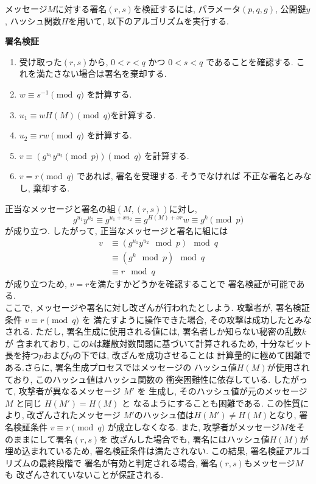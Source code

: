 \vspace{1em}
メッセージ$M$に対する署名$(r, s)$を検証するには, パラメータ$(p,q,g)$, 
公開鍵$y$, ハッシュ関数$H$を用いて, 以下のアルゴリズムを実行する.
\vspace{1em}
\let\ltxlist\list
\begin{breakitembox}[l]{\textbf{署名検証}}
  　
  \begin{enumerate}[parsep=7pt]
    \item 受け取った$(r,s)$から, $0<r<q$ かつ $0<s<q$ であることを確認する. 
    これを満たさない場合は署名を棄却する.
    \item $w\equiv s^{-1}\pmod q$ を計算する.
    \item $u_1\equiv wH(M)\pmod q$を計算する.
    \item $u_2\equiv rw\pmod q$ を計算する.
    \item $v\equiv (g^{u_1}y^{u_2}\pmod p)\pmod q$ を計算する.
    \item $v=r\pmod  q$ であれば, 署名を受理する. そうでなければ
    不正な署名とみなし, 棄却する.
  \end{enumerate}
\end{breakitembox}
\vspace{1em}
\indent 正当なメッセージと署名の組$(M, (r, s))$に対し, 
\[
  g^{u_1}y^{u_2}\equiv g^{u_1+xu_2} \equiv g^{H(M)+xr}w\equiv g^{k}\pmod p
\]
が成り立つ. したがって, 正当なメッセージと署名に組には 
\begin{align*}
  v &\equiv (g^{u_1}y^{u_2} \mod p) \mod q \\
    &\equiv (g^k \mod p) \mod q \\
    &\equiv r \mod q
\end{align*}
が成り立つため, $v=r$を満たすかどうかを確認することで
署名検証が可能である.\\
\indent ここで, メッセージや署名に対し改ざんが行われたとしよう. 
攻撃者が, 署名検証条件 $v \equiv r \pmod{q}$ を
満たすように操作できた場合, その攻撃は成功したとみなされる. ただし, 
署名生成に使用される値には, 署名者しか知らない秘密の乱数$k$が
含まれており, この$k$は離散対数問題に基づいて計算されるため, 
十分なビット長を持つ$p$および$q$の下では, 改ざんを成功させることは
計算量的に極めて困難である.さらに, 署名生成プロセスではメッセージの
ハッシュ値$H(M)$が使用されており, このハッシュ値はハッシュ関数の
衝突困難性に依存している. したがって, 攻撃者が異なるメッセージ $M'$ を
生成し, そのハッシュ値が元のメッセージ $M$ と同じ $H(M') = H(M)$ と
なるようにすることも困難である. この性質により, 改ざんされたメッセージ
$M'$のハッシュ値は$H(M')\neq H(M)$となり, 
署名検証条件 $v \equiv r \pmod{q}$ が成立しなくなる.
また, 攻撃者がメッセージ$M$をそのままにして署名$(r, s)$を
改ざんした場合でも, 署名にはハッシュ値$H(M)$が埋め込まれているため, 
署名検証条件は満たされない. この結果, 署名検証アルゴリズムの最終段階で
署名が有効と判定される場合, 署名$(r, s)$もメッセージ$M$も
改ざんされていないことが保証される.\\[1em]

